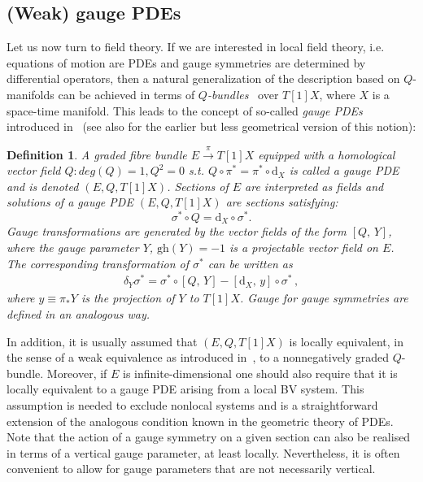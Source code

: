 \documentclass[a4paper,12pt]{article}
\numberwithin{equation}{section} %
\newtheorem{definition}[thm]{Definition}
\newcommand{\gh}[1]{\mathrm{gh}(#1)}
\newcommand{\dx}{\mathrm{d}_X}
\newcommand{\commut}[2]{[#1{,}\,#2]}
\begin{document}
\subsection{(Weak) gauge PDEs}

Let us now turn to field theory. If we are interested in local field theory, i.e. equations of motion are PDEs and gauge symmetries are determined by differential operators, then a natural generalization of the description based on $Q$-manifolds can be achieved in terms of \textit{$Q$-bundles}~\cite{Kotov:2007nr} over $T[1]X$, where $X$ is a space-time manifold. This leads to the concept of so-called \textit{gauge PDEs} introduced in~\cite{Grigoriev:2019ojp} (see also \cite{Barnich:2010sw,Barnich:2004cr} for the earlier but less geometrical version of this notion):
\begin{definition}
    A graded fibre bundle $E \xrightarrow{\pi} T[1]X$ equipped with a homological vector field $Q: deg(Q) =1, Q^2=0$ s.t. $Q \circ \pi^* = \pi^* \circ \dx$ is called a \textit{gauge PDE} and is denoted $(E,Q,T[1]X)$.  Sections of $E$ are interpreted as fields and solutions of a gauge PDE $(E,Q,T[1]X)$ are sections satisfying:
    \begin{equation} \label{gPDE-sol}
        \sigma^* \circ Q = \dx \circ \sigma^*.
    \end{equation}
    Gauge transformations are generated by the vector fields of the form $\commut{Q}{Y}$, where the gauge parameter $Y$, $\gh{Y}=-1$ is a projectable  vector field on $E$. The corresponding transformation of $\sigma^*$ can be written as 
    \begin{align}\label{gaugetransf}
        \delta_Y\sigma^{*}={\sigma}^{*}\circ \commut{Q}{Y}-\commut{\dx}{y}\circ \sigma^*\,,
    \end{align}
    where $y\equiv \pi_* Y$ is the projection of $Y$ to $T[1]X$. Gauge for gauge symmetries are defined in an analogous way.
\end{definition}
In addition, it is usually assumed that  $(E,Q,T[1]X)$ is locally equivalent, in the sense of a weak equivalence as introduced in~\cite{Grigoriev:2019ojp}, to a nonnegatively graded $Q$-bundle. Moreover, if $E$ is infinite-dimensional one should also require that it is locally equivalent to a gauge PDE arising from a local BV system. This assumption is needed to exclude nonlocal systems and is a straightforward extension of the analogous condition known in the geometric theory of PDEs. Note that the action of a gauge symmetry on a given section can also be realised in terms of a vertical gauge parameter, at least locally. Nevertheless, it is often convenient to allow for gauge parameters that are not necessarily vertical.
\end{document}
